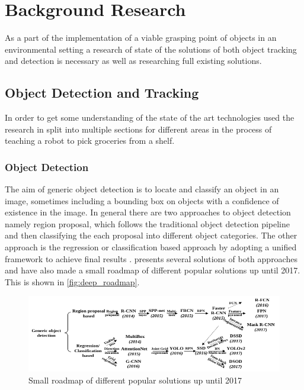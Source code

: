\chapter{Background Research}\glsresetall
\label{cha:Research}
As a part of the implementation of a viable grasping point of objects in an environmental setting a research of state of the solutions of both object tracking and detection is necessary as well as researching full existing solutions.

\section{Object Detection and Tracking}
In order to get some understanding of the state of the art technologies used the research in split into multiple sections for different areas in the process of teaching a robot to pick groceries from a shelf.

\subsection{Object Detection}
The aim of generic object detection is to locate and classify an object in an image, sometimes including a bounding box on objects with a confidence of existence in the image. In general there are two approaches to object detection namely region proposal, which follows the traditional object detection pipeline and then classifying the each proposal into different object categories. The other approach is the regression or classification based approach by adopting a unified framework to achieve final results \citep{zhao}.
\cite{zhao} presents several solutions of both approaches and have also made a small roadmap of different popular solutions up until 2017. This is shown in \autoref{fig:deep_roadmap}.

\begin{figure}[H]
  \centering
  \includegraphics[width=\textwidth]{figures/deep_roadmap.pdf}
  \caption{Small roadmap of different popular solutions up until 2017 \citep{zhao}}
  \label{fig:deep_roadmap}
\end{figure}

